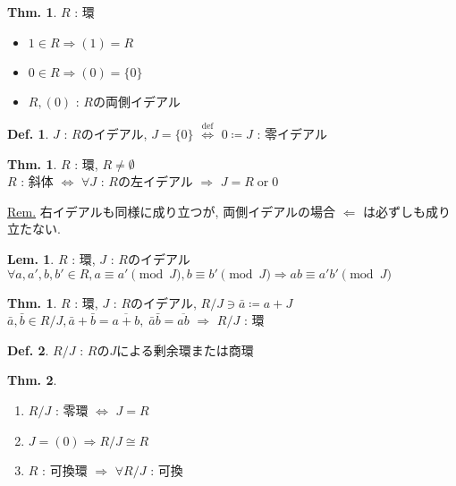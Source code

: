\documentclass[uplatex,dvipdfmx,9pt]{beamer}
\newcommand{\defarrow}{\overset{\mathrm{def}}{\Leftrightarrow}}
\newcounter{textThmCount}
\newcounter{textLemCount}
\theoremstyle{definition} %
\newtheorem{defn}{Def.}[subsection] %
\newtheorem{thm}{Thm.}[subsection] %
\newtheorem{thmText}[textThmCount]{Thm.}
\newtheorem{lemText}[textLemCount]{Lem.} %
\theoremstyle{example}
\begin{document}
    \begin{frame}

       \begin{thm}
        $R$ : 環
        \begin{itemize}
          \item $1 \in R \Rightarrow (1) = R$
          \item $0 \in R \Rightarrow (0) = \{0\}$
          \item $R, (0)$ : $R$の両側イデアル
        \end{itemize}
      \end{thm}

      \begin{defn}
        $J$ : $R$のイデアル, $J = \{0\}$ $\defarrow$ $0 \coloneqq J$ : \alert{零イデアル}
      \end{defn}

      \begin{thmText}
        $R$ : 環, $R \neq \emptyset$ \\
        $R$ : 斜体 $\Leftrightarrow$ $\forall J$ : $R$の左イデアル $\Rightarrow$ $J = R \; \text{or} \; 0$
      \end{thmText}
      \underline{Rem.} 右イデアルも同様に成り立つが, 両側イデアルの場合 $\Leftarrow$ は必ずしも成り立たない.

    \end{frame}

    \begin{frame}

      \begin{lemText}
        $R$ : 環, $J$ : $R$のイデアル \\
        $\forall a, a', b, b' \in R, a \equiv a' \pmod{J}, b \equiv b' \pmod{J} \Rightarrow ab \equiv a'b' \pmod{J}$
      \end{lemText}

      \begin{thmText}
        $R$ : 環, $J$ : $R$のイデアル, $R/J \ni \bar{a} \coloneqq a + J$ \\
        $\bar{a}, \bar{b} \in R/J, \bar{a} + \bar{b} = \overline{a + b}, \; \bar{a}\bar{b} = \overline{ab}$ $\Rightarrow$ $R/J$ : 環
      \end{thmText}

      \begin{defn}
        $R/J$ : $R$の$J$による\alert{剰余環}または\alert{商環}
      \end{defn}

      \begin{thm}
        \begin{enumerate}
          \item $R/J$ : 零環 $\Leftrightarrow$ $J = R$
          \item $J = (0) \Rightarrow R/J \cong R$
          \item $R$ : 可換環 $\Rightarrow$ $\forall R/J$ : 可換
        \end{enumerate}
      \end{thm}

    \end{frame}
\end{document}
